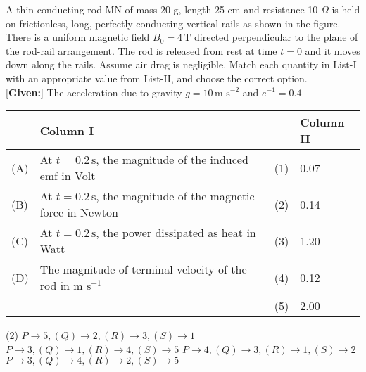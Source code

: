 \item A thin conducting rod MN of mass 20 g, length 25 cm and resistance 10 $\Omega$ is held on frictionless, long, perfectly conducting vertical rails as shown in the figure. There is a uniform magnetic field $B_0 = 4 \, \text{T}$ directed perpendicular to the plane of the rod-rail arrangement. The rod is released from rest at time $t = 0$ and it moves down along the rails. Assume air drag is negligible. Match each quantity in List-I with an appropriate value from List-II, and choose the correct option.\\[2 mm]

[\textbf{Given:}] The acceleration due to gravity $g = 10 \, \text{m s}^{-2}$ and $e^{-1} = 0.4$ 

\begin{center}
\end{center}



\begin{center}
\renewcommand{\arraystretch}{2}
\begin{table}[h]
    \centering
    \begin{tabular}{p{0.25cm}p{9cm}|p{0.25cm}p{4cm}}
    \hline
    & Column I & & Column II \\
    \hline
    (A) & At $t = 0.2 \, \text{s}$, the magnitude of the induced emf in Volt & (1) & 0.07 \\
    (B) & At $t = 0.2 \, \text{s}$, the magnitude of the magnetic force in Newton & (2) & 0.14 \\
    (C) & At $t = 0.2 \, \text{s}$, the power dissipated as heat in Watt & (3) & 1.20 \\
    (D) & The magnitude of terminal velocity of the rod in $\text{m s}^{-1}$ & (4) & 0.12 \\
     &  & (5) & 2.00 \\
    \hline
    \end{tabular}
\end{table}
\end{center}

\begin{tasks}(2)
    \task $P \rightarrow 5, (Q) \rightarrow 2, (R) \rightarrow 3, (S) \rightarrow 1$
    \task $P \rightarrow 3, (Q) \rightarrow 1, (R) \rightarrow 4, (S) \rightarrow 5$
    \task $P \rightarrow 4, (Q) \rightarrow 3, (R) \rightarrow 1, (S) \rightarrow 2$
    \task $P \rightarrow 3, (Q) \rightarrow 4, (R) \rightarrow 2, (S) \rightarrow 5$\ans
\end{tasks}